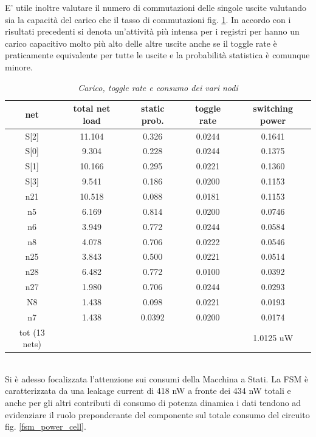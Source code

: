 E’ utile inoltre valutare il numero di commutazioni delle singole uscite valutando sia la capacità del carico che il tasso di commutazioni fig. \ref{attload}. In accordo con i risultati precedenti si denota un’attività più intensa per i registri per hanno un carico capacitivo molto più alto delle altre uscite anche se il toggle rate è praticamente equivalente per tutte le uscite e la probabilità statistica è comunque minore.\\ 
\begin{table}[!h]\footnotesize
	\centering
	\begin{tabular}{|c|c|c|c|c|}
		\hline
		\textbf{net} & \textbf{total net load} & \textbf{static prob.} & \textbf{toggle rate}& \textbf{switching power}\\
		\hline
		S[2] & 11.104 & 0.326 & 0.0244 & 0.1641\\
		\hline
		S[0] & 9.304 & 0.228 & 0.0244 & 0.1375\\
		\hline
		S[1] & 10.166 & 0.295 & 0.0221 & 0.1360\\
		\hline
		S[3] & 9.541 & 0.186 & 0.0200 & 0.1153\\
		\hline
		n21 & 10.518 & 0.088 & 0.0181 & 0.1153\\
		\hline
		n5 & 6.169 & 0.814 & 0.0200 & 0.0746\\
		\hline
		n6 & 3.949 & 0.772 & 0.0244 & 0.0584\\
		\hline
		n8 & 4.078 & 0.706 & 0.0222 & 0.0546\\
		\hline
		n25 & 3.843 & 0.500 & 0.0221 & 0.0514\\
		\hline
		n28 & 6.482 & 0.772 & 0.0100 & 0.0392\\
		\hline
		n27 & 1.980 & 0.706 & 0.0244 & 0.0293\\
		\hline
		N8 & 1.438 & 0.098 & 0.0221 & 0.0193\\
		\hline
		n7 & 1.438 & 0.0392 & 0.0200 & 0.0174\\
		\hline
		\hline
		tot (13 nets) &  &  &  & 1.0125 uW\\
		\hline 
	\end{tabular}
	\caption{\textit{Carico, toggle rate e consumo dei vari nodi}}
\label{attload}
\end{table} \\
Si è adesso focalizzata l’attenzione sui consumi della Macchina a Stati. La FSM è caratterizzata da una leakage current di 418 nW a fronte dei 434 nW totali e anche per gli altri contributi di consumo di potenza dinamica i dati tendono ad evidenziare il ruolo preponderante del componente sul totale consumo del circuito fig. \ref{fsm_power_cell}.
